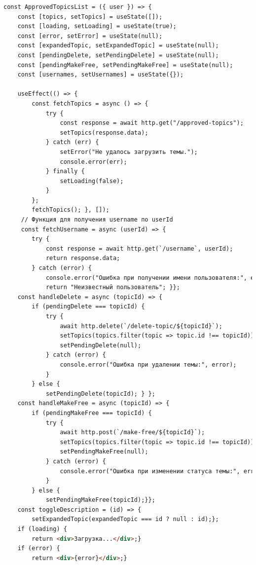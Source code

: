 \documentclass[14pt]{extarticle} %
\begin{document}
\label{approvedTopicsList}

\begin{lstlisting}[language=html, caption={Клиентская часть ApprovedTopicsList}]
const ApprovedTopicsList = ({ user }) => {
    const [topics, setTopics] = useState([]);
    const [loading, setLoading] = useState(true);
    const [error, setError] = useState(null);
    const [expandedTopic, setExpandedTopic] = useState(null);
    const [pendingDelete, setPendingDelete] = useState(null);
    const [pendingMakeFree, setPendingMakeFree] = useState(null); 
    const [usernames, setUsernames] = useState({});

    useEffect(() => {
        const fetchTopics = async () => {
            try {
                const response = await http.get("/approved-topics");
                setTopics(response.data);
            } catch (err) {
                setError("Не удалось загрузить темы.");
                console.error(err);
            } finally {
                setLoading(false);
            }
        };
        fetchTopics(); }, []);
     // Функция для получения username по userId
     const fetchUsername = async (userId) => {
        try {
            const response = await http.get(`/username`, userId);
            return response.data;
        } catch (error) {
            console.error("Ошибка при получении имени пользователя:", error);
            return "Неизвестный пользователь"; }};
    const handleDelete = async (topicId) => {
        if (pendingDelete === topicId) {
            try {
                await http.delete(`/delete-topic/${topicId}`);
                setTopics(topics.filter(topic => topic.id !== topicId));
                setPendingDelete(null);
            } catch (error) {
                console.error("Ошибка при удалении темы:", error);
            }
        } else {
            setPendingDelete(topicId); } };
    const handleMakeFree = async (topicId) => {
        if (pendingMakeFree === topicId) {
            try {
                await http.post(`/make-free/${topicId}`);
                setTopics(topics.filter(topic => topic.id !== topicId)); 
                setPendingMakeFree(null); 
            } catch (error) {
                console.error("Ошибка при изменении статуса темы:", error);
            }
        } else {
            setPendingMakeFree(topicId);}};
    const toggleDescription = (id) => {
        setExpandedTopic(expandedTopic === id ? null : id);};
    if (loading) {
        return <div>Загрузка...</div>;}
    if (error) {
        return <div>{error}</div>;}

\end{lstlisting}
\end{document}
